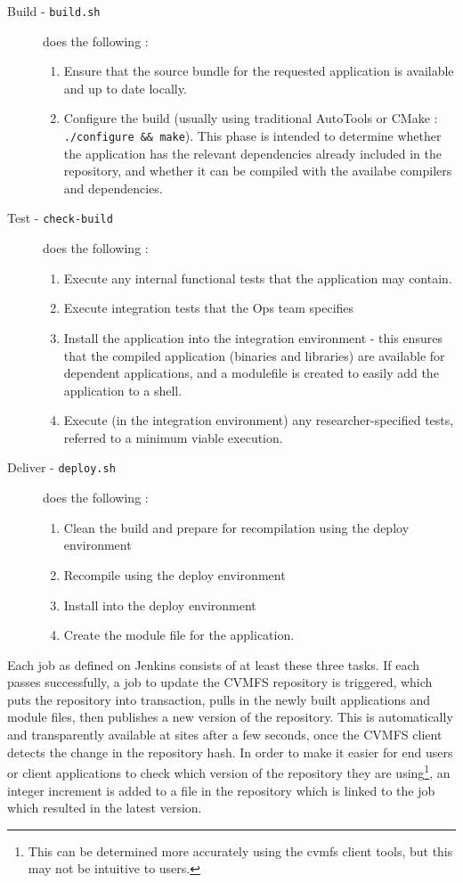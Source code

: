 \documentclass[a4paper]{jpconf}
\begin{document}
  \begin{description}
    \item[Build - \texttt{build.sh}] does the following :
      \begin{enumerate}[label=\arabic*]
        \item Ensure that the source bundle for the requested application is available and up to date locally.
        \item Configure the build (usually using traditional AutoTools \cite{AutoTools} or CMake \cite{CMake} : \texttt{./configure \&\& make}). This phase is intended to determine whether the application has the relevant dependencies already included in the repository, and whether it can be compiled with the availabe compilers and dependencies.
      \end{enumerate}
    \item[Test - \texttt{check-build}] does the following :
      \begin{enumerate}[label=\arabic*]
        \item Execute any internal functional tests that the application may contain.
        \item Execute integration tests that the Ops team specifies
        \item Install the application into the integration environment - this ensures that the compiled application (binaries and libraries) are available for dependent applications, and a modulefile is created to easily add the application to a shell.
        \item Execute (in the integration environment) any researcher-specified tests, referred to a minimum viable execution.
      \end{enumerate}
    \item[Deliver - \texttt{deploy.sh}] does the following :
      \begin{enumerate}[label=\arabic* ]
        \item Clean the build and prepare for recompilation using the deploy environment
        \item Recompile using the deploy environment
        \item Install into the deploy environment
        \item Create the module file for the application.
      \end{enumerate}
  \end{description}

Each job as defined on Jenkins consists of at least these three tasks. If each passes successfully, a job to update the CVMFS repository is triggered, which puts the repository into transaction, pulls in the newly built applications and module files, then publishes a new version of the repository. This is automatically and transparently available at sites after a few seconds, once the CVMFS client detects the change in the repository hash. In order to make it easier for end users or client applications to check which version of the repository they are using\footnote{This can be determined more accurately using the cvmfs client tools, but this may not be intuitive to users.}, an integer increment is added to a file in the repository which is linked to the job which resulted in the latest version.
\end{document}
